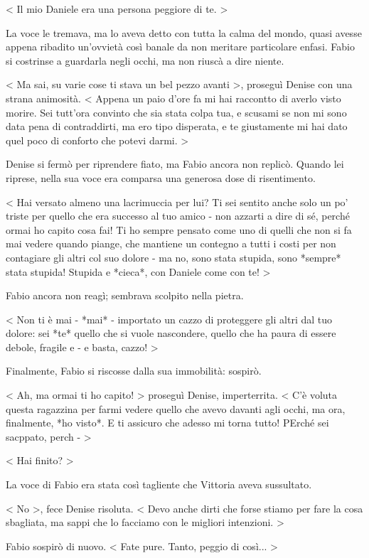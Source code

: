 < Il mio Daniele era una persona peggiore di te. >

La voce le tremava, ma lo aveva detto con tutta la calma del mondo, quasi avesse appena ribadito un'ovvietà così banale da non meritare particolare enfasi. Fabio si costrinse a guardarla negli occhi, ma non riuscà a dire niente.

< Ma sai, su varie cose ti stava un bel pezzo avanti >, proseguì Denise con una strana animosità. < Appena un paio d'ore fa mi hai raccontto di averlo visto morire. Sei tutt'ora convinto che sia stata colpa tua, e scusami se non mi sono data pena di contraddirti, ma ero tipo disperata, e te giustamente mi hai dato quel poco di conforto che potevi darmi. >

Denise si fermò per riprendere fiato, ma Fabio ancora non replicò. Quando lei riprese, nella sua voce era comparsa una generosa dose di risentimento.

< Hai versato almeno una lacrimuccia per lui? Ti sei sentito anche solo un po' triste per quello che era successo al tuo amico - non azzarti a dire di sé, perché ormai ho capito cosa fai! Ti ho sempre pensato come uno di quelli che non si fa mai vedere quando piange, che mantiene un contegno a tutti i costi per non contagiare gli altri col suo dolore - ma no, sono stata stupida, sono *sempre* stata stupida! Stupida e *cieca*, con Daniele come con te! >

Fabio ancora non reagì; sembrava scolpito nella pietra.

< Non ti è mai - *mai* - importato un cazzo di proteggere gli altri dal tuo dolore: sei *te* quello che si vuole nascondere, quello che ha paura di essere debole, fragile e - e basta, cazzo! >

Finalmente, Fabio si riscosse dalla sua immobilità: sospirò.

< Ah, ma ormai ti ho capito! > proseguì Denise, imperterrita. < C'è voluta questa ragazzina per farmi vedere quello che avevo davanti agli occhi, ma ora, finalmente, *ho visto*. E ti assicuro che adesso mi torna tutto! PErché sei sacppato, perch - >

< Hai finito? >

La voce di Fabio era stata così tagliente che Vittoria aveva sussultato.

< No >, fece Denise risoluta. < Devo anche dirti che forse stiamo per fare la cosa sbagliata, ma sappi che lo facciamo con le migliori intenzioni. >

Fabio sospirò di nuovo. < Fate pure. Tanto, peggio di così... >

